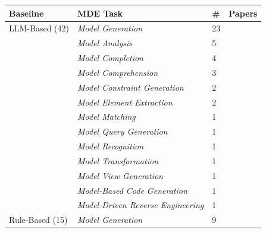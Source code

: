 \begin{tabular} {p{}  p{} p{} p{}} \\ 
\toprule 
Baseline & MDE Task & \# & Papers\\ 
\midrule  
LLM-Based (42) & \emph{Model Generation} & 23 & \cite{ \papereighteenth,\paperthirtysecond,\paperfiftyninth,\paperninetyfifth,\paperonehundredth,\paperonehundrednineteenth,\paperonehundredthirtieth,\paperonehundredthirtythird,\paperonehundredthirtyninth,\paperonehundredfortyfirst,\paperonehundredsixtysecond,\paperonehundredninetieth,\paperonehundredninetysecond,\paperonehundredninetyfourth,\paperonehundredninetysixth,\papertwohundredseventh,\papertwohundredtwelfth,\papertwohundredfifteenth,\papertwohundredtwentyseventh,\papertwohundredtwentyninth,\papertwohundredfortyfourth,\papertwohundredfortyseventh,\papertwohundredfiftysecond }\\ 
 & \emph{Model Analysis} & 5 & \cite{ \paperonehundredfortieth,\paperonehundredfortyfirst,\paperonehundredfortysecond,\paperonehundredninetyfifth,\papertwohundrednineteenth }\\ 
 & \emph{Model Completion} & 4 & \cite{ \papersixtyseventh,\paperonehundredfortieth,\paperonehundredfortyfirst,\paperonehundredseventyfourth }\\ 
 & \emph{Model Comprehension} & 3 & \cite{ \paperthirtythird,\paperninetyfourth,\papertwohundredthirtyfifth }\\ 
 & \emph{Model Constraint Generation} & 2 & \cite{ \paperseventyeighth,\paperonehundredsixth }\\ 
 & \emph{Model Element Extraction} & 2 & \cite{ \paperthirtyninth,\paperonehundredthirtysixth }\\ 
 & \emph{Model Matching} & 1 & \cite{ \paperseventh }\\ 
 & \emph{Model Query Generation} & 1 & \cite{ \papersixtysixth }\\ 
 & \emph{Model Recognition} & 1 & \cite{ \papertwohundredthirtyseventh }\\ 
 & \emph{Model Transformation} & 1 & \cite{ \papertwohundredeighth }\\ 
 & \emph{Model View Generation} & 1 & \cite{ \paperfiftysecond }\\ 
 & \emph{Model-Based Code Generation} & 1 & \cite{ \paperonehundredninetysixth }\\ 
 & \emph{Model-Driven Reverse Engineering} & 1 & \cite{ \paperfourth }\\ 
\midrule  
Rule-Based (15) & \emph{Model Generation} & 9 & \cite{ \papersixteenth,\paperseventyseventh,\papereightyninth,\paperonehundredtenth,\paperonehundredtwentyfifth,\paperonehundredthirtyseventh,\paperonehundredthirtyeighth,\paperonehundredninetysecond,\papertwohundredfortyfourth }\\ 

\end{tabular}
